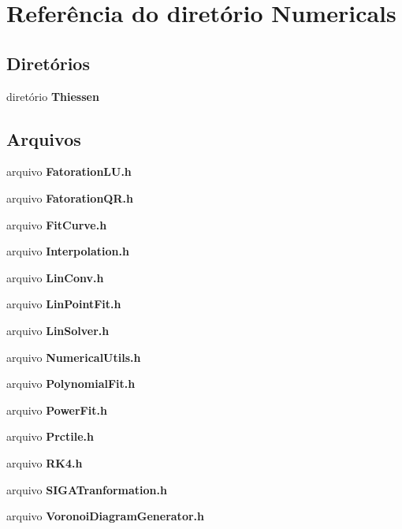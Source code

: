 \section{Referência do diretório Numericals}
\label{dir_d05c01daa81ce1fba575844f32bce985}
\subsection*{Diretórios}
\begin{DoxyCompactItemize}
\item 
diretório {\bf Thiessen}
\end{DoxyCompactItemize}
\subsection*{Arquivos}
\begin{DoxyCompactItemize}
\item 
arquivo {\bf Fatoration\+L\+U.\+h}
\item 
arquivo {\bf Fatoration\+Q\+R.\+h}
\item 
arquivo {\bf Fit\+Curve.\+h}
\item 
arquivo {\bf Interpolation.\+h}
\item 
arquivo {\bf Lin\+Conv.\+h}
\item 
arquivo {\bf Lin\+Point\+Fit.\+h}
\item 
arquivo {\bf Lin\+Solver.\+h}
\item 
arquivo {\bf Numerical\+Utils.\+h}
\item 
arquivo {\bf Polynomial\+Fit.\+h}
\item 
arquivo {\bf Power\+Fit.\+h}
\item 
arquivo {\bf Prctile.\+h}
\item 
arquivo {\bf R\+K4.\+h}
\item 
arquivo {\bf S\+I\+G\+A\+Tranformation.\+h}
\item 
arquivo {\bf Voronoi\+Diagram\+Generator.\+h}
\end{DoxyCompactItemize}
